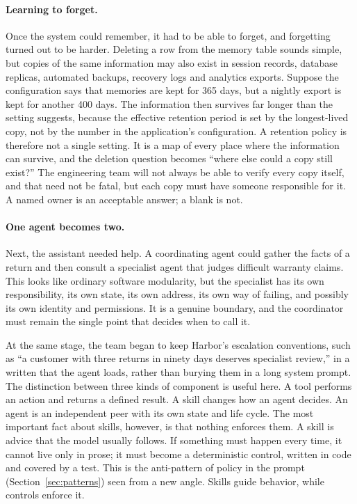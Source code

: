 \paragraph{Learning to forget.} Once the system could remember, it had to be able to forget, and forgetting turned out to be harder. Deleting a row from the memory table sounds simple, but copies of the same information may also exist in session records, database replicas, automated backups, recovery logs and analytics exports. Suppose the configuration says that memories are kept for 365 days, but a nightly export is kept for another 400 days. The information then survives far longer than the setting suggests, because the effective retention period is set by the longest-lived copy, not by the number in the application's configuration. A retention policy is therefore not a single setting. It is a map of every place where the information can survive, and the deletion question becomes ``where else could a copy still exist?'' The engineering team will not always be able to verify every copy itself, and that need not be fatal, but each copy must have someone responsible for it. A named owner is an acceptable answer; a blank is not.

\paragraph{One agent becomes two.} Next, the assistant needed help. A coordinating agent could gather the facts of a return and then consult a specialist agent that judges difficult warranty claims. This looks like ordinary software modularity, but the specialist has its own responsibility, its own state, its own address, its own way of failing, and possibly its own identity and permissions. It is a genuine boundary, and the coordinator must remain the single point that decides when to call it.

At the same stage, the team began to keep Harbor's escalation conventions, such as ``a customer with three returns in ninety days deserves specialist review,'' in a written  that the agent loads, rather than burying them in a long system prompt. The distinction between three kinds of component is useful here. A tool performs an action and returns a defined result. A skill changes how an agent decides. An agent is an independent peer with its own state and life cycle. The most important fact about skills, however, is that nothing enforces them. A skill is advice that the model usually follows. If something must happen every time, it cannot live only in prose; it must become a deterministic control, written in code and covered by a test. This is the anti-pattern of policy in the prompt (Section~\ref{sec:patterns}) seen from a new angle. Skills guide behavior, while controls enforce it.


